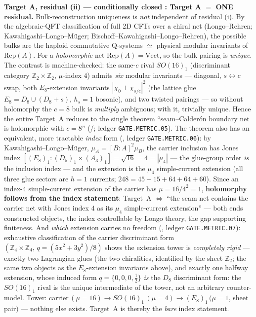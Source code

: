 \documentclass[11pt,a4paper]{article}
\begin{document}
\begin{winbox}
\smallskip\noindent\textbf{Target A, residual (ii) --- conditionally closed \mE: Target A $=$ ONE residual.}
Bulk-reconstruction uniqueness is \emph{not} independent of residual (i). By the algebraic-QFT classification of
full 2D CFTs over a chiral net (Longo--Rehren; Kawahigashi--Longo--M\"uger; Bischoff--Kawahigashi--Longo--Rehren),
the possible bulks are the haploid commutative Q-systems $\simeq$ physical modular invariants of $\mathrm{Rep}(A)$.
For a \emph{holomorphic} net $\mathrm{Rep}(A)=\mathrm{Vect}$, so the bulk pairing is \emph{unique}. The contrast is
machine-checked: the same-$c$ rival $SO(16)_1$ (discriminant category $\mathbb Z_2{\times}\mathbb Z_2$, $\mu$-index $4$) admits
\emph{six} modular invariants --- diagonal, $s{\leftrightarrow}c$ swap, both $E_8$-extension invariants
$|\chi_0{+}\chi_{s/c}|^2$ (the lattice glue $E_8=D_8\cup(D_8{+}s)$, $h_s{=}1$ bosonic), and two twisted pairings ---
so without holomorphy the $c=8$ bulk is \emph{multiply} ambiguous; with it, trivially unique. Hence the entire
Target~A reduces to the single theorem ``seam--Calder\'on boundary net is holomorphic with $c=8$'' (\mC/\mO;
ledger \texttt{GATE.METRIC.05}). The theorem also has an equivalent, more tractable \emph{index} form
(, ledger \texttt{GATE.METRIC.06}): by Kawahigashi--Longo--M\"uger,
$\mu_A=[B{:}A]^2\mu_B$, the carrier inclusion has Jones index
$[(E_8)_1:(D_5)_1{\times}(A_3)_1]=\sqrt{16}=4=|\mu_4|$ --- the glue-group order \emph{is} the inclusion
index --- and the extension is the $\mu_4$ simple-current extension (all three glue sectors are $h=1$
currents; $248=45{+}15{+}64{+}64{+}60$). Since an index-$4$ simple-current extension of the carrier has
$\mu=16/4^2=1$, \textbf{holomorphy follows from the index statement}: Target~A $\Leftrightarrow$ ``the seam
net contains the carrier net with Jones index $4$ as its $\mu_4$ simple-current extension'' --- both ends
constructed objects, the index controllable by Longo theory, the gap supporting finiteness. And \emph{which}
extension carries no freedom (, ledger \texttt{GATE.METRIC.07}): exhaustive
classification of the carrier discriminant form $(\mathbb Z_4{\times}\mathbb Z_4,\,q{=}(5x^2{+}3y^2)/8)$ shows the
extension tower is \emph{completely rigid} --- exactly two Lagrangian glues (the two chiralities, identified
by the sheet $\mathbb Z_2$; the same two objects as the $E_8$-extension invariants above), and exactly one halfway
extension, whose induced form $q=\{0,0,0,\tfrac12\}$ \emph{is} the $D_8$ discriminant form: the $SO(16)_1$
rival is the unique intermediate of the tower, not an arbitrary counter-model. Tower:
carrier\,$(\mu{=}16)\to SO(16)_1\,(\mu{=}4)\to(E_8)_1\,(\mu{=}1$, sheet pair$)$ --- nothing else exists.
Target~A is thereby the \emph{bare} index statement.


\end{winbox}
\end{document}
